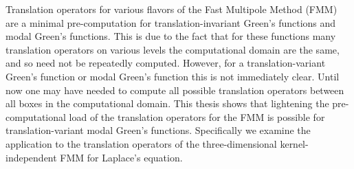 %
Translation operators for various flavors of the Fast Multipole Method (FMM) are a minimal pre-computation for translation-invariant Green's functions and modal Green's functions. This is due to the fact that for these functions many translation operators on various levels the computational domain are the same, and so need not be repeatedly computed. However, for a translation-variant Green's function or modal Green's function this is not immediately clear. Until now one may have needed to compute all possible translation operators between all boxes in the computational domain. This thesis shows that lightening the pre-computational load of the translation operators for the FMM is possible for translation-variant modal Green's functions. Specifically we examine the application to the translation operators of the three-dimensional kernel-independent FMM for Laplace's equation.
